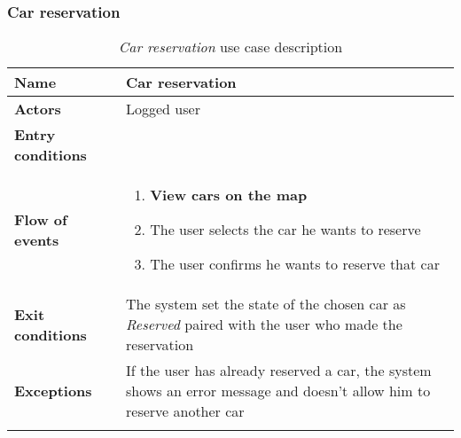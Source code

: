 \subsubsection{Car reservation}
\begin{longtable}{p{0.25\linewidth}p{0.75\linewidth}}
\toprule
\textbf{Name} & \textbf{Car reservation} \\
\midrule
\textbf{Actors} &  Logged user \\
\midrule
\textbf{Entry conditions} & \\
\midrule
\textbf{Flow of events} & 
\begin{enumerate}
	\item \textbf{View cars on the map}
	\item The user selects the car he wants to reserve
	\item The user confirms he wants to reserve that car
\end{enumerate}\\
\midrule
\textbf{Exit conditions} & The system set the state of the chosen car as \emph{Reserved} paired with the user who made the reservation\\
\midrule
\textbf{Exceptions} &  If the user has already reserved a car, the system shows an error message and doesn't allow him to reserve another car \\
\bottomrule
\caption{\emph{Car reservation} use case description}
\end{longtable}

\clearpage
